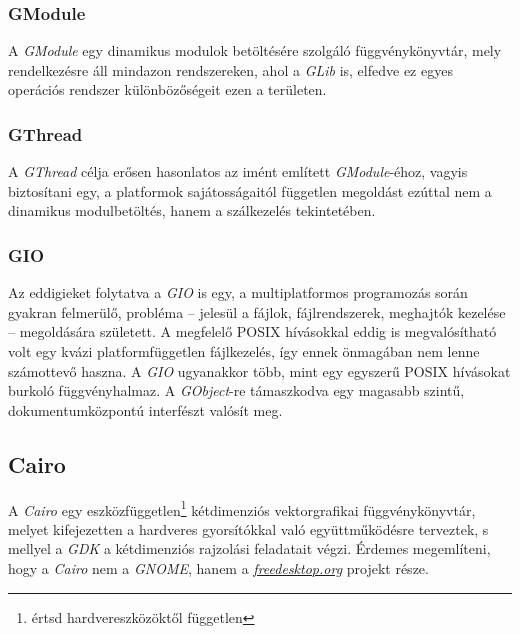 \subsubsection{GModule}

A \textit{GModule} egy dinamikus modulok betöltésére szolgáló függvénykönyvtár, mely rendelkezésre áll mindazon rendszereken, ahol a \textit{GLib} is, elfedve ez egyes operációs rendszer különbözőségeit ezen a területen.

\subsubsection{GThread}

A \textit{GThread} célja erősen hasonlatos az imént említett \textit{GModule}-éhoz, vagyis biztosítani egy, a platformok sajátosságaitól független megoldást ezúttal nem a dinamikus modulbetöltés, hanem a szálkezelés tekintetében.

\subsubsection{GIO}

Az eddigieket folytatva a \textit{GIO} is egy, a multiplatformos programozás során gyakran felmerülő, probléma -- jelesül a fájlok, fájlrendszerek, meghajtók kezelése -- megoldására született. A megfelelő POSIX hívásokkal eddig is megvalósítható volt egy kvázi platformfüggetlen fájlkezelés, így ennek önmagában nem lenne számottevő haszna. A \textit{GIO} ugyanakkor több, mint egy egyszerű POSIX hívásokat burkoló függvényhalmaz. A \textit{GObject}-re támaszkodva egy magasabb szintű, dokumentumközpontú interfészt valósít meg.

\subsection{Cairo}

A \textit{Cairo} egy eszközfüggetlen\footnote{értsd hardvereszközöktől független} kétdimenziós vektorgrafikai függvénykönyvtár, melyet kifejezetten a hardveres gyorsítókkal való együttműködésre terveztek, s mellyel a \textit{GDK} a kétdimenziós rajzolási feladatait végzi. Érdemes megemlíteni, hogy a \textit{Cairo} nem a \textit{GNOME}, hanem a \href{http://freedesktop.org}{\textit{freedesktop.org}} projekt része.

